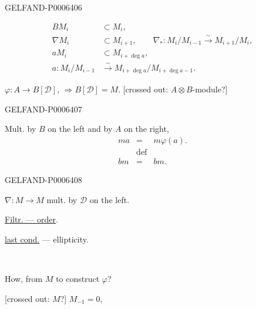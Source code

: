 \begin{GelfandAdjacentEvidence}{GELFAND-P000640}{6}

\[
\begin{aligned}
BM_i&\subset M_i,\\
\nabla M_i&\subset M_{i+1},\qquad
\nabla_*:M_i/M_{i-1}\overset{\sim}{\to}M_{i+1}/M_i,\\
aM_i&\subset M_{i+\operatorname{deg}a},\\
a:M_i/M_{i-1}&\overset{\sim}{\to}M_{i+\operatorname{deg}a}/M_{i+\operatorname{deg}a-1}.
\end{aligned}
\]

\begin{center}\textemdash\end{center}

\underline{\(\varphi:A\to B[\mathcal D]\)}, \(\Rightarrow B[\mathcal D]=M\).
[crossed out: \(A\otimes B\)-module?]
\end{GelfandAdjacentEvidence}
\begin{GelfandAdjacentEvidence}{GELFAND-P000640}{7}


Mult. by \(B\) on the left and by \(A\) on the right,
\[
\begin{array}{rcl}
ma &=& m\varphi(a).\\[-.4ex]
   & \scriptstyle\mathrm{def} & \\[-.6ex]
bm &=& bm.
\end{array}
\]
\end{GelfandAdjacentEvidence}
\begin{GelfandAdjacentEvidence}{GELFAND-P000640}{8}


\(\nabla:M\to M\) mult. by \(\mathcal D\) on the left.

\underline{Filtr. --- order}.

\underline{last cond.} --- ellipticity.

\begin{center}\textemdash\,\textperiodcentered\,\textemdash\end{center}

How, from \(M\) to construct \(\varphi\)?

[crossed out: \(M\)?] \(M_{-1}=0\),
\end{GelfandAdjacentEvidence}
